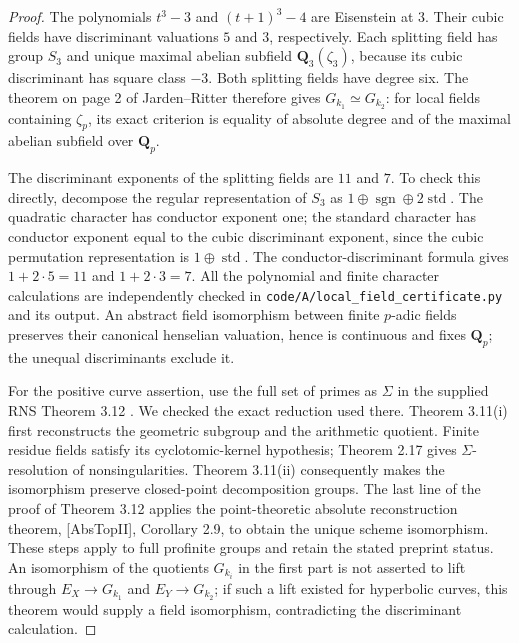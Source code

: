 \documentclass[11pt,oneside]{article}
\begin{document}
\begin{proof}
The polynomials $t^3-3$ and $(t+1)^3-4$ are Eisenstein at
$3$. Their cubic fields have discriminant valuations $5$ and
$3$, respectively. Each splitting field has group $S_3$ and
unique maximal abelian subfield $\mathbf Q_3(\zeta_3)$,
because its cubic discriminant has square class $-3$.
Both splitting fields have degree six. The theorem on page 2
of Jarden--Ritter \cite{A_JardenRitter1979} therefore gives
$G_{k_1}\simeq G_{k_2}$: for local fields containing
$\zeta_p$, its exact criterion is equality of absolute degree
and of the maximal abelian subfield over $\mathbf Q_p$.

The discriminant exponents of the splitting fields are $11$
and $7$. To check this directly, decompose the regular
representation of $S_3$ as
$1\oplus\operatorname{sgn}\oplus2\operatorname{std}$.
The quadratic character has conductor exponent one; the
standard character has conductor exponent equal to the
cubic discriminant exponent, since the cubic permutation
representation is $1\oplus\operatorname{std}$. The
conductor-discriminant formula gives $1+2\cdot5=11$ and
$1+2\cdot3=7$. All the polynomial and finite character
calculations are independently checked in
\texttt{code/A/local\_field\_certificate.py} and its output.
An abstract field isomorphism between finite $p$-adic fields
preserves their canonical henselian valuation, hence is
continuous and fixes $\mathbf Q_p$; the unequal discriminants
exclude it.

For the positive curve assertion, use the full set of primes
as $\Sigma$ in the supplied RNS Theorem 3.12
\cite{A_MochizukiTsujimuraRNS}. We checked the exact
reduction used there. Theorem 3.11(i) first reconstructs the
geometric subgroup and the arithmetic quotient. Finite
residue fields satisfy its cyclotomic-kernel hypothesis;
Theorem 2.17 gives $\Sigma$-resolution of nonsingularities.
Theorem 3.11(ii) consequently makes the isomorphism preserve
closed-point decomposition groups. The last line of the
proof of Theorem 3.12 applies the point-theoretic absolute
reconstruction theorem, [AbsTopII], Corollary 2.9, to obtain
the unique scheme isomorphism. These steps apply to full
profinite groups and retain the stated preprint status.
An isomorphism of the quotients $G_{k_i}$ in the first part
is not asserted to lift through $E_X\to G_{k_1}$ and
$E_Y\to G_{k_2}$; if such a lift existed for hyperbolic
curves, this theorem would supply a field isomorphism,
contradicting the discriminant calculation.
\end{proof}
\end{document}
